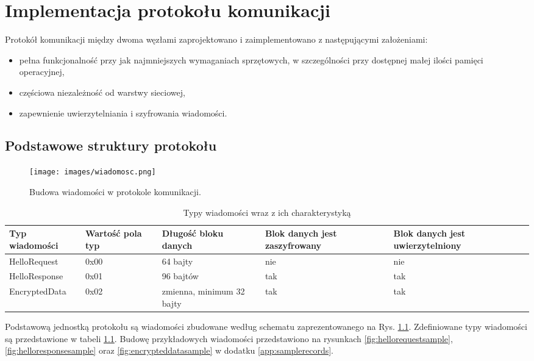 \chapter{Implementacja protokołu komunikacji}
\label{cha:implementacja}

Protokół komunikacji między dwoma węzłami zaprojektowano i zaimplementowano z następującymi założeniami:

\begin{itemize}
\item pełna funkcjonalność przy jak najmniejszych wymaganiach sprzętowych, w szczególności przy dostępnej małej ilości pamięci operacyjnej,
\item częściowa niezależność od warstwy sieciowej,
\item zapewnienie uwierzytelniania i szyfrowania wiadomości.
\end{itemize}

\section{Podstawowe struktury protokołu}
\label{sec:proto}

\begin{figure}[h]
\centering
\texttt{[image: images/wiadomosc.png]}
\caption{Budowa wiadomości w protokole komunikacji.}
\label{fig:message-def}
\end{figure}

\begin{table}[t]
\centering
\caption{Typy wiadomości wraz z ich charakterystyką}
\begin{tabular}{|p{2.3cm}|p{1.4cm}|l|p{2.9cm}|p{3.1cm}|}
    \hline
    \textbf{Typ \mbox{wiadomości}}  &
    \textbf{Wartość pola typ}  &
    \textbf{Długość bloku danych}  &
    \textbf{Blok danych jest zaszyfrowany}  &
    \textbf{Blok danych jest uwierzytelniony}\\
    \hline
    HelloRequest & 0x00 & 64 bajty & nie & nie\\
    \hline
    HelloResponse & 0x01 & 96 bajtów & tak & tak\\
    \hline
    EncryptedData & 0x02 & zmienna, minimum 32 bajty & tak & tak\\
    \hline
\end{tabular}
\label{tab:recordtypes}
\end{table}

Podstawową jednostką protokołu są wiadomości zbudowane według schematu zaprezentowanego na Rys. \ref{fig:message-def}. Zdefiniowane typy wiadomości są przedstawione w tabeli \ref{tab:recordtypes}. Budowę przykładowych wiadomości przedstawiono na rysunkach \ref{fig:hellorequestsample}, \ref{fig:helloresponsesample} oraz \ref{fig:encrypteddatasample} w dodatku \ref{app:samplerecords}.


